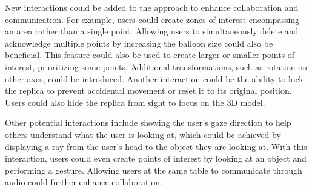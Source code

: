     New interactions could be added to the approach to enhance collaboration and communication. For example, users could create zones of interest encompassing an area rather than a single point. Allowing users to simultaneously delete and acknowledge multiple points by increasing the balloon size could also be beneficial. This feature could also be used to create larger or smaller points of interest, prioritizing some points. Additional transformations, such as rotation on other axes, could be introduced. Another interaction could be the ability to lock the replica to prevent accidental movement or reset it to its original position. Users could also hide the replica from sight to focus on the 3D model.

    Other potential interactions include showing the user's gaze direction to help others understand what the user is looking at, which could be achieved by displaying a ray from the user's head to the object they are looking at. With this interaction, users could even create points of interest by looking at an object and performing a gesture. Allowing users at the same table to communicate through audio could further enhance collaboration.

